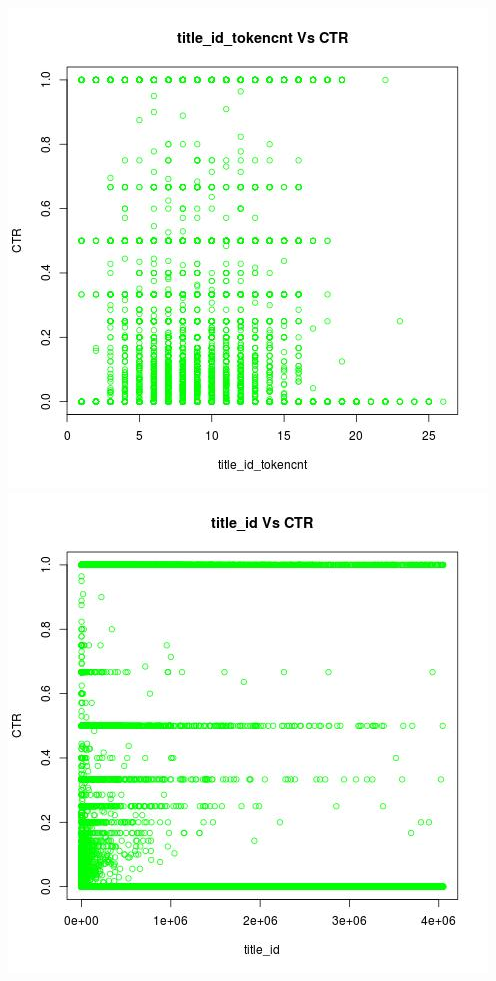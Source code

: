 \documentclass[10pt]{article}
\begin{document}
\includegraphics[scale=0.5]{title_id_tokencnt_Vs_CTR}
\includegraphics[scale=0.5]{title_id_Vs_CTR}\\\\
\end{document}
